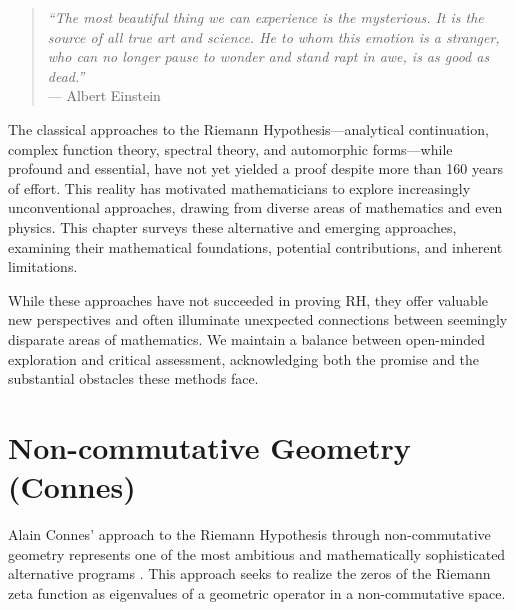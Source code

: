 

\begin{quote}
\textit{``The most beautiful thing we can experience is the mysterious. It is the source of all true art and science. He to whom this emotion is a stranger, who can no longer pause to wonder and stand rapt in awe, is as good as dead.''} \\
--- Albert Einstein
\end{quote}

The classical approaches to the Riemann Hypothesis---analytical continuation, complex function theory, spectral theory, and automorphic forms---while profound and essential, have not yet yielded a proof despite more than 160 years of effort. This reality has motivated mathematicians to explore increasingly unconventional approaches, drawing from diverse areas of mathematics and even physics. This chapter surveys these alternative and emerging approaches, examining their mathematical foundations, potential contributions, and inherent limitations.

While these approaches have not succeeded in proving RH, they offer valuable new perspectives and often illuminate unexpected connections between seemingly disparate areas of mathematics. We maintain a balance between open-minded exploration and critical assessment, acknowledging both the promise and the substantial obstacles these methods face.

\section{Non-commutative Geometry (Connes)}
\label{sec:noncommutative_geometry}

Alain Connes' approach to the Riemann Hypothesis through non-commutative geometry represents one of the most ambitious and mathematically sophisticated alternative programs \cite{connes1999}. This approach seeks to realize the zeros of the Riemann zeta function as eigenvalues of a geometric operator in a non-commutative space.

